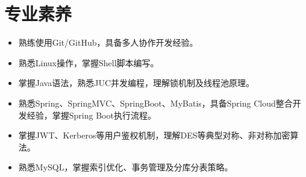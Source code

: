 \documentclass[a4paper,11pt]{ctexart}
\newenvironment{resumeList}{\begin{itemize}[leftmargin=*,label={}]}{\end{itemize}}
\newcommand{\resumeItem}[1]{\item\small{#1}}
\begin{document}
\section{专业素养}
\begin{resumeList}
    \resumeItem{熟练使用Git/GitHub，具备多人协作开发经验。}
    \resumeItem{熟悉Linux操作，掌握Shell脚本编写。}
    \resumeItem{掌握Java语法，熟悉JUC并发编程，理解锁机制及线程池原理。}
    \resumeItem{熟悉Spring、SpringMVC、SpringBoot、MyBatis，具备Spring Cloud整合开发经验，掌握Spring Boot执行流程。}
    \resumeItem{掌握JWT、Kerberos等用户鉴权机制，理解DES等典型对称、非对称加密算法。}
    \resumeItem{熟悉MySQL，掌握索引优化、事务管理及分库分表策略。}
\end{resumeList}
\end{document}
